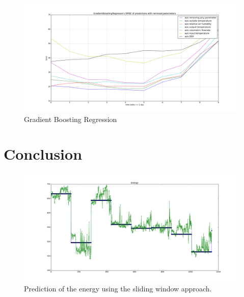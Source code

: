 \documentclass{scrartcl}
\begin{document}
\begin{figure}[H]
  \center
  \includegraphics[width=1\linewidth]{img/GradientBoostingRegressor_day_error_without_some_params.png}
  \caption{Gradient Boosting Regression}
  \label{fig:GradientBoostingRegressor_day_error_without_some_params}
\end{figure}

\section{Conclusion}
\label{sec:conclusion}
\begin{figure}[H]
  \center
  \includegraphics[width=0.6\linewidth]{img/predict-energy--0p890.png}
  \caption{Prediction of the energy using the sliding window approach.}
  \label{fig:Prediction}
\end{figure}






\end{document}
